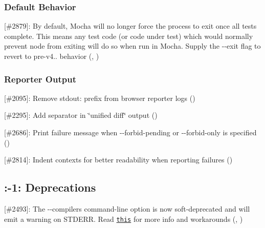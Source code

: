 \subsubsection*{Default Behavior}


\begin{DoxyItemize}
\item \mbox{[}\#2879\mbox{]}\+: By default, Mocha will no longer force the process to exit once all tests complete. This means any test code (or code under test) which would normally prevent {\ttfamily node} from exiting will do so when run in Mocha. Supply the {\ttfamily -\/-\/exit} flag to revert to pre-\/v4.. behavior (\href{https://github.com/ScottFreeCode}{\tt }, \href{https://github.com/boneskull}{\tt })
\end{DoxyItemize}

\subsubsection*{Reporter Output}


\begin{DoxyItemize}
\item \mbox{[}\#2095\mbox{]}\+: Remove {\ttfamily stdout\+:} prefix from browser reporter logs (\href{https://github.com/skeggse}{\tt })
\item \mbox{[}\#2295\mbox{]}\+: Add separator in \char`\"{}unified diff\char`\"{} output (\href{https://github.com/olsonpm}{\tt })
\item \mbox{[}\#2686\mbox{]}\+: Print failure message when {\ttfamily -\/-\/forbid-\/pending} or {\ttfamily -\/-\/forbid-\/only} is specified (\href{https://github.com/ScottFreeCode}{\tt })
\item \mbox{[}\#2814\mbox{]}\+: Indent contexts for better readability when reporting failures (\href{https://github.com/charlierudolph}{\tt })
\end{DoxyItemize}

\subsection*{\+:-\/1\+: Deprecations}


\begin{DoxyItemize}
\item \mbox{[}\#2493\mbox{]}\+: The {\ttfamily -\/-\/compilers} command-\/line option is now soft-\/deprecated and will emit a warning on {\ttfamily S\+T\+D\+E\+RR}. Read \href{https://github.com/mochajs/mocha/wiki/compilers-deprecation}{\tt this} for more info and workarounds (\href{https://github.com/ScottFreeCode}{\tt }, \href{https://github.com/boneskull}{\tt })
\end{DoxyItemize}

